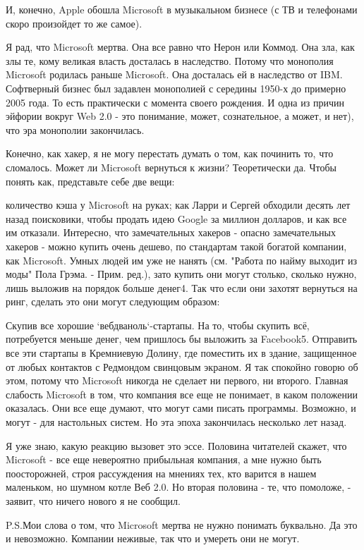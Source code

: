 \documentclass[ebook,12pt,oneside,openany]{memoir}
\begin{document}
И, конечно, Apple обошла Microsoft в музыкальном бизнесе (с ТВ и
телефонами скоро произойдет то же самое).

Я рад, что Microsoft мертва. Она все равно что Нерон или Коммод. Она
зла, как злы те, кому великая власть досталась в наследство. Потому
что монополия Microsoft родилась раньше Microsoft. Она досталась ей в
наследство от IBM. Софтверный бизнес был задавлен монополией с
середины 1950-х до примерно 2005 года. То есть практически с момента
своего рождения. И одна из причин эйфории вокруг Web 2.0 - это
понимание, может, сознательное, а может, и нет), что эра монополии
закончилась.

Конечно, как хакер, я не могу перестать думать о том, как починить то,
что сломалось. Может ли Microsoft вернуться к жизни? Теоретически да.
Чтобы понять как, представьте себе две вещи:

количество кэша у Microsoft на руках; как Ларри и Сергей обходили
десять лет назад поисковики, чтобы продать идею Google за миллион
долларов, и как все им отказали. Интересно, что замечательных хакеров
- опасно замечательных хакеров - можно купить очень дешево, по
стандартам такой богатой компании, как Microsoft. Умных людей им уже
не нанять (см. "Работа по найму выходит из моды" Пола Грэма. - Прим.
ред.), зато купить они могут столько, сколько нужно, лишь выложив на
порядок больше денег4. Так что если они захотят вернуться на ринг,
сделать это они могут следующим образом:

Скупив все хорошие `вебдваноль`-стартапы. На то, чтобы скупить всё,
потребуется меньше денег, чем пришлось бы выложить за Facebook5.
Отправить все эти стартапы в Кремниевую Долину, где поместить их в
здание, защищенное от любых контактов с Редмондом свинцовым экраном. Я
так спокойно говорю об этом, потому что Microsoft никогда не сделает
ни первого, ни второго. Главная слабость Microsoft в том, что компания
все еще не понимает, в каком положении оказалась. Они все еще думают,
что могут сами писать программы. Возможно, и могут - для настольных
систем. Но эта эпоха закончилась несколько лет назад.

Я уже знаю, какую реакцию вызовет это эссе. Половина читателей скажет,
что Microsoft - все еще невероятно прибыльная компания, а мне нужно
быть поосторожней, строя рассуждения на мнениях тех, кто варится в
нашем маленьком, но шумном котле Веб 2.0. Но вторая половина - те, что
помоложе, - заявит, что ничего нового я не сообщил.

P.S.Мои слова о том, что Microsoft мертва не нужно понимать буквально.
Да это и невозможно. Компании неживые, так что и умереть они не могут.
\end{document}
